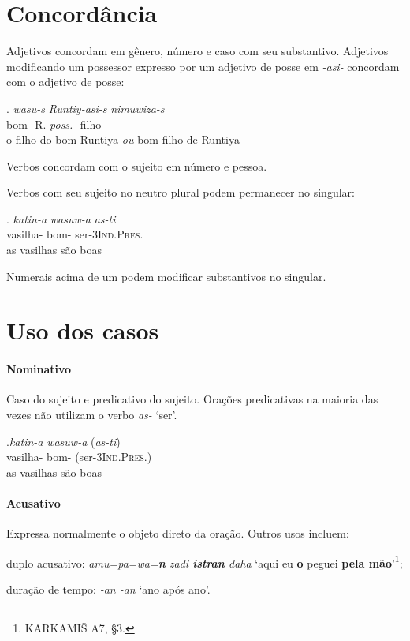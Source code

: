 
\section{Concordância}

Adjetivos concordam em gênero, número e caso com seu
substantivo.
Adjetivos modificando um possessor expresso por um adjetivo de posse em
\emph{-asi-} concordam com o adjetivo de posse:

\exg. \emph{wasu-s} \emph{Runtiy-asi-s} \emph{nimuwiza-s}\\
bom-\Nom\Sg\Com{} R.-\emph{poss.}-\Nom\Sg\Com{} filho-\Nom{}\Sg\Com{}\\
o filho do bom Runtiya \emph{ou} bom filho de Runtiya


\noindent Verbos concordam com o sujeito em número e pessoa.

Verbos com seu sujeito no neutro plural podem permanecer no singular:

\exg. \emph{katin-a} \emph{wasuw-a} \emph{as-ti}\\
vasilha-\Nom\Pl\Neut{} bom-\Nom\Pl\Neut{} ser-3\Sg\textsc{Ind.Pres.}\\
as vasilhas são boas


\noindent Numerais acima de um podem modificar substantivos no singular.


\section{Uso dos casos}

\paragraph{Nominativo}
Caso do sujeito e predicativo do sujeito.
Orações predicativas na maioria das vezes não utilizam o verbo \emph{as-} `ser'.

\exg.\emph{katin-a} \emph{wasuw-a} (\emph{as-ti})\\
vasilha-\Nom\Pl\Neut{} bom-\Nom\Pl\Neut{} (ser-3\Sg\textsc{Ind.Pres.})\\
as vasilhas são boas


\paragraph{Acusativo}
Expressa normalmente o objeto direto da oração.
Outros usos incluem:
\begin{inparaenum}[(a)]
	\item duplo acusativo:
	\emph{amu=pa=wa=\textbf{n} zadi \textbf{istran} daha}
	`aqui eu \textbf{o} peguei \textbf{pela mão}'\footnote{KARKAMIŠ A7, §3.};
	\item duração de tempo: \emph{-an -an} `ano após
	ano'.
\end{inparaenum}


